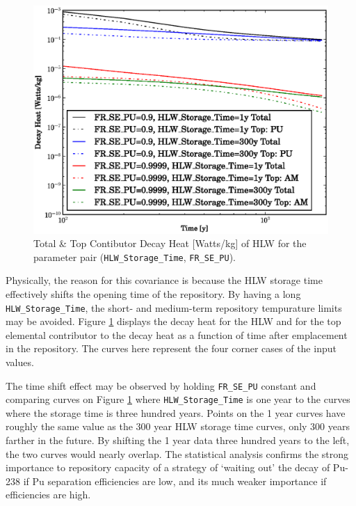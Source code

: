 \begin{figure}[htbp]
\begin{center}
\includegraphics[scale=0.70]{ct_sensitivity/figs/FR_SE_PU_and_HLW_Storage_Time_Decay_Heat.eps}
\caption{Total \& Top Contibutor Decay Heat [Watts/kg] of HLW for the parameter pair (\texttt{HLW\_Storage\_Time}, \texttt{FR\_SE\_PU}).}
\label{hlw_pu_decay_heat}
\end{center}
\end{figure}

Physically, the reason for this covariance is because the HLW storage 
time effectively shifts the opening time of the repository.
By having a long \texttt{HLW\_Storage\_Time}, the short- and medium-term 
repository tempurature limits may be avoided.
Figure \ref{hlw_pu_decay_heat} displays the decay heat for the HLW and for 
the top elemental contributor to the decay heat as a
function of time after emplacement in the repository.  The curves here 
represent the four corner cases of the input values.

The time shift effect may be observed by holding \texttt{FR\_SE\_PU} constant 
and comparing curves on Figure \ref{hlw_pu_decay_heat}
where \texttt{HLW\_Storage\_Time} is one year to the curves where the storage 
time is three hundred years.  Points on the 1 year curves have
roughly the same value as the 300 year HLW storage time curves, only 300 years 
farther in the future.  By shifting the 1 year data
three hundred years to the left, the two curves would nearly overlap.  The 
statistical analysis confirms the strong importance to repository capacity 
of a strategy of `waiting out' the decay of Pu-238 if Pu separation efficiencies 
are low, and its much weaker importance if efficiencies are high.

